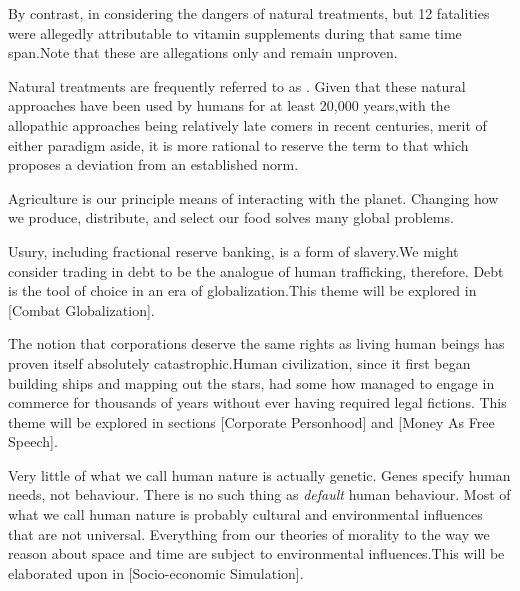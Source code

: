 By contrast, in considering the dangers of natural treatments, but 12 fatalities were allegedly attributable to vitamin supplements during that same time span. Note that these are allegations only and remain unproven. 

Natural treatments are frequently referred to as . Given that these natural approaches have been used by humans for at least 20,000 years,\footnotecite[hardy2012] with the allopathic approaches being relatively late comers in recent centuries, merit of either paradigm aside, it is more rational to reserve the term  to that which proposes a deviation from an established norm.


Agriculture is our principle means of interacting with the planet. Changing how we produce, distribute, and select our food solves many global problems.\footnotecite[foodwaste]


Usury, including fractional reserve banking, is a form of slavery. We might consider trading in debt to be the analogue of human trafficking, therefore. Debt is the tool of choice in an era of globalization.\footnotecite[perkins2005] This theme will be explored in [Combat Globalization].


The notion that corporations deserve the same rights as living human beings has proven itself absolutely catastrophic. Human civilization, since it first began building ships and mapping out the stars, had some how managed to engage in commerce for thousands of years without ever having required legal fictions. This theme will be explored in sections \in{}[Corporate Personhood] and \in{}[Money As Free Speech].


Very little of what we call human nature is actually genetic. Genes specify human needs, not behaviour. There is no such thing as {\it default} human behaviour. Most of what we call human nature is probably cultural and environmental influences that are not universal. Everything from our theories of morality to the way we reason about space and time are subject to environmental influences.\footnotecite[henrich2010] This will be elaborated upon in [Socio-economic Simulation].
\stopitemize

